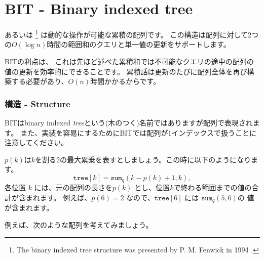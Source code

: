 \section{BIT - Binary indexed tree}


 あるいは \footnote{The
binary indexed tree structure was presented by P. M. Fenwick in 1994 \cite{fen94}.}
は動的な操作が可能な累積の配列です。
この構造は配列に対して2つの$O(\log n)$時間の範囲和のクエリと単一値の更新をサポートします。

BITの利点は、
これは先ほど述べた累積和では不可能なクエリの途中の配列の値の更新を効率的にできることです。
累積話は更新のたびに配列全体を再び構築する必要があり、$O(n)$時間かかるからです。

\subsubsection{構造 - Structure}

BITはbinary indexed \emph{tree}という(木のつく)名前ではありますが配列で表現されます。
また、実装を容易にするためにBITでは配列が1インデックスで扱うことに注意してください。

$p(k)$は$k$を割る2の最大累乗を表すとしましょう。この時に以下のようになります。
\[ \texttt{tree}[k] = \texttt{sum}_q(k-p(k)+1,k),\]
各位置 $k$ には、元の配列の長さを$p(k)$ とし、位置$k$で終わる範囲までの値の合計が含まれます。
例えば、$p(6) = 2$ なので、$\texttt{tree}[6]$ には 
$\texttt{sum}_q(5,6)$の 値が含まれます。

例えば、次のような配列を考えてみましょう。
\begin{center}
\end{center}

